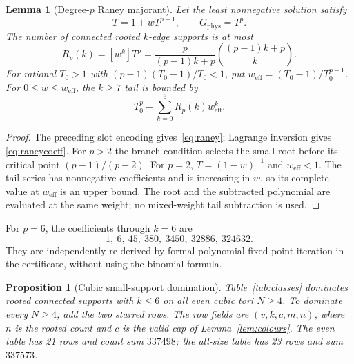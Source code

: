 \documentclass[11pt]{article}
\theoremstyle{plain}
\newtheorem{lemma}{Lemma}
\newtheorem{proposition}{Proposition}
\theoremstyle{remark}
\newcommand{\phys}{\mathrm{phys}}
\begin{document}
\begin{lemma}[Degree-$p$ Raney majorant]\label{lem:raney}
Let the least nonnegative solution satisfy
\begin{equation}\label{eq:raney}
T=1+wT^{p-1},\qquad G_{\phys}=T^p.
\end{equation}
The number of connected rooted $k$-edge supports is at most
\begin{equation}\label{eq:raneycoeff}
R_p(k)=[w^k]T^p=
\frac{p}{(p-1)k+p}\binom{(p-1)k+p}{k}.
\end{equation}
For rational $T_0>1$ with $(p-1)(T_0-1)/T_0<1$, put
$w_{\mathrm{eff}}=(T_0-1)/T_0^{p-1}$.
For $0\le w\le w_{\mathrm{eff}}$, the $k\ge7$ tail is bounded by
\begin{equation}\label{eq:raneytail}
T_0^p-\sum_{k=0}^6 R_p(k)w_{\mathrm{eff}}^k.
\end{equation}
\end{lemma}
\begin{proof}
The preceding slot encoding gives~\eqref{eq:raney}; Lagrange inversion gives
\eqref{eq:raneycoeff}. For $p>2$ the branch condition selects the small root
before its critical point $(p-1)/(p-2)$. For $p=2$, $T=(1-w)^{-1}$ and
$w_{\mathrm{eff}}<1$. The tail series has nonnegative coefficients and is
increasing in $w$, so its complete value at $w_{\mathrm{eff}}$ is an upper
bound. The root and the subtracted polynomial are evaluated at the same
weight; no mixed-weight tail subtraction is used.
\end{proof}

For $p=6$, the coefficients through $k=6$ are
\[
1,\ 6,\ 45,\ 380,\ 3450,\ 32886,\ 324632.
\]
They are independently re-derived by formal polynomial fixed-point iteration
in the certificate, without using the binomial formula.

\begin{proposition}[Cubic small-support domination]\label{prop:classes}
Table~\ref{tab:classes} dominates rooted connected supports with $k\le6$ on
all even cubic tori $N\ge4$. To dominate every $N\ge4$, add the two starred
rows. The row fields are $(v,k,c,m,n)$, where $n$ is the rooted count and $c$
is the valid cap of Lemma~\ref{lem:colours}. The even table has 21 rows and
count sum $337498$; the all-size table has 23 rows and sum $337573$.
\end{proposition}
\end{document}
